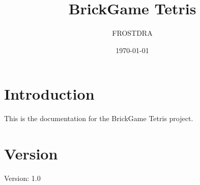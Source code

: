 \documentclass{article}
\title{BrickGame Tetris}
\author{FROSTDRA}
\date{\today}
\begin{document}
\maketitle

\section{Introduction}
This is the documentation for the BrickGame Tetris project.

\section{Version}
Version: 1.0
\end{document}
